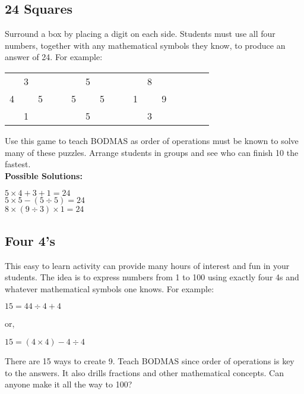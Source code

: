 	\subsection{24 Squares} \label{24squares}
	Surround a box by placing a digit on each side. Students must use all four numbers, together with any mathematical symbols they know, to produce an answer of 24. For example:
	\begin{center}
	\begin{tabular}{c c c  c c c c  c c c  c c c c  c c c} 
	& 3 &   &&&    & 5 &    &&&    & 8 &\\ \cline{2-2} \cline{7-7} \cline{12-12}
	4 & \multicolumn{1}{|c|}{} & 5    &&&    5 & \multicolumn{1}{|c|}{} & 5    &&&    1 & \multicolumn{1}{|c|}{} & 9\\ \cline{2-2} \cline{7-7} \cline{12-12}
	& 1 &	&&&   & 5 &    &&&    & 3 &
	\end{tabular}
	\end{center}
	Use this game to teach BODMAS as order of operations must be known to solve many of these puzzles. Arrange students in groups and see who can finish 10 the fastest.\\
	
	\textbf{Possible Solutions:}
	\begin{center}
	$5 \times 4 + 3 + 1 = 24 $\\
	$ 5 \times 5 - (5 \div 5) = 24 $\\
	$ 8 \times (9 \div 3) \times 1 = 24 $ 
	\end{center}
	
	\subsection{Four 4's} \label{fourfours}
	This easy to learn activity can provide many hours of interest and fun in your students. The idea is to express numbers from 1 to 100 using exactly four 4s and whatever mathematical symbols one knows. For example:
	\begin{center}
	$15 = 44 \div 4 + 4$
	\end{center}
or,
	\begin{center}
	$15 = (4 \times 4) - 4 \div 4$
	\end{center}
	There are 15 ways to create 9. Teach BODMAS since order of operations is key to the answers. It also drills fractions and other mathematical concepts. Can anyone make it all the way to 100?
	
